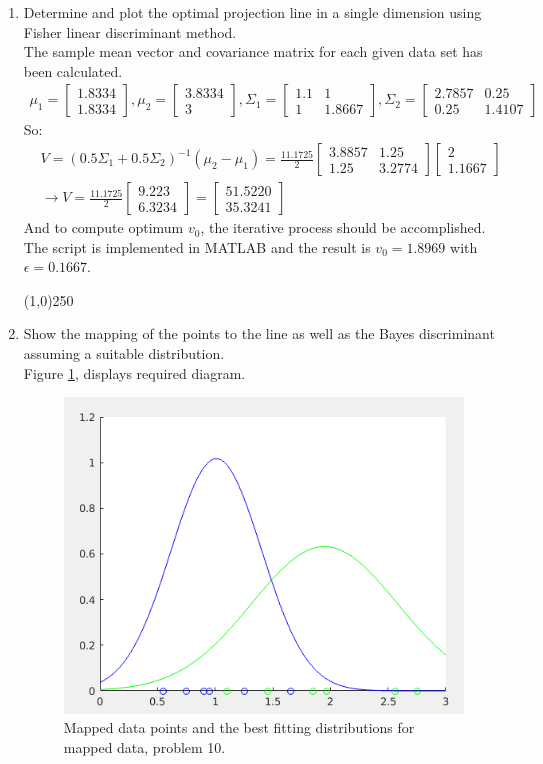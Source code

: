 \documentclass[12pt]{article}
\newcommand{\svector}[2]{\left[ \begin{matrix} #1 \\ #2 \end{matrix}\right]}
\newcommand{\smatrix}[4]{\left[ \begin{matrix} #1 & #2 \\ #3 & #4 \end{matrix}\right]}
\begin{document}
\begin{enumerate}
\item Determine and plot the optimal projection line in a single dimension using Fisher linear discriminant method. \\

The sample mean vector and covariance matrix for each given data set has been calculated.
\begin{align*}
\mu_1 = \svector{1.8334}{1.8334}, \mu_2 = \svector{3.8334}{3}, \Sigma_1 = \smatrix{1.1}{1}{1}{1.8667}, \Sigma_2 = \smatrix{2.7857}{0.25}{0.25}{1.4107}
\end{align*}
So:
\begin{align*}
&V = (0.5 \Sigma_1 + 0.5\Sigma_2)^{-1}(\mu_2 - \mu_1) = \frac{11.1725}{2}\smatrix{3.8857}{1.25}{1.25}{3.2774}\svector{2}{1.1667} \\
&\rightarrow V = \frac{11.1725}{2}\svector{9.223}{6.3234} = \svector{51.5220}{35.3241}
\end{align*}
And to compute optimum $v_0$, the iterative process should be accomplished. The script is implemented in MATLAB and the result is $v_0 = 1.8969$ with $\epsilon = 0.1667$.


\begin{center}
\line(1,0){250}
\end{center}

\item Show the mapping of the points to the line as well as the Bayes discriminant assuming a suitable distribution.\\

Figure \ref{fig:10-1}, displays required diagram.
\begin{figure}[h]
\centering
\includegraphics[scale=0.4]{Imgs/10-1.png}
\caption{Mapped data points and the best fitting distributions for mapped data, problem 10.}
\label{fig:10-1}

\end{figure}


\end{enumerate}
\end{document}
